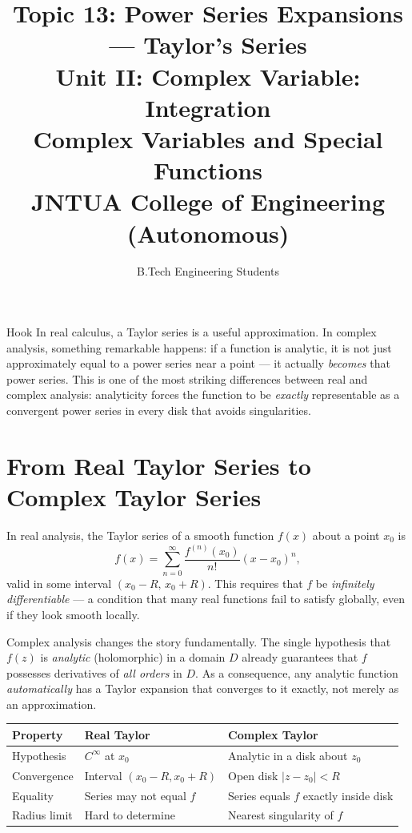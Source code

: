 \documentclass[12pt,a4paper]{article}
\title{\textbf{Topic 13: Power Series Expansions --- Taylor's Series}\\
\large Unit II: Complex Variable: Integration\\
Complex Variables and Special Functions\\
JNTUA College of Engineering (Autonomous)}
\author{B.Tech Engineering Students}
\date{}
\begin{document}
\maketitle
\tableofcontents
\newpage

\begin{curiositybox}{Hook}
In real calculus, a Taylor series is a useful approximation. In complex analysis, something remarkable happens: if a function is analytic, it is not just approximately equal to a power series near a point --- it actually \emph{becomes} that power series. This is one of the most striking differences between real and complex analysis: analyticity forces the function to be \emph{exactly} representable as a convergent power series in every disk that avoids singularities.
\end{curiositybox}

\bigskip

\section{From Real Taylor Series to Complex Taylor Series}

In real analysis, the Taylor series of a smooth function $f(x)$ about a point $x_0$ is
\[
  f(x) = \sum_{n=0}^{\infty} \frac{f^{(n)}(x_0)}{n!}(x - x_0)^n,
\]
valid in some interval $(x_0 - R,\, x_0 + R)$. This requires that $f$ be \emph{infinitely differentiable} --- a condition that many real functions fail to satisfy globally, even if they look smooth locally.

Complex analysis changes the story fundamentally. The single hypothesis that $f(z)$ is \emph{analytic} (holomorphic) in a domain $D$ already guarantees that $f$ possesses derivatives of \emph{all orders} in $D$. As a consequence, any analytic function \emph{automatically} has a Taylor expansion that converges to it exactly, not merely as an approximation.

\begin{center}
\begin{tabular}{lll}
\toprule
\textbf{Property} & \textbf{Real Taylor} & \textbf{Complex Taylor} \\
\midrule
Hypothesis & $C^\infty$ at $x_0$ & Analytic in a disk about $z_0$ \\
Convergence & Interval $(x_0-R,x_0+R)$ & Open disk $|z-z_0|<R$ \\
Equality & Series may not equal $f$ & Series equals $f$ exactly inside disk \\
Radius limit & Hard to determine & Nearest singularity of $f$ \\
\bottomrule
\end{tabular}
\end{center}
\end{document}
